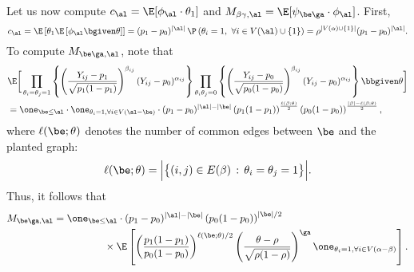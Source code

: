 \documentclass[11pt]{article}
\begin{document}
Let us now compute $c_{\al}=\E[\phi_{\al}\cdot \theta_1]$ and $M_{\beta\gamma, \al}=\E[\psi_{\be \ga}\cdot \phi_{\al}]$. First,
\begin{equation}\label{eq:c:pds}
c_{\al}=\E\left[\theta_1\E\left[\phi_{\al}\bgiven \theta\right]\right]=(p_1-p_0)^{|\al|}\,\P\left(\theta_i=1,~\forall i\in V(\al)\cup \{1\}\right)=\rho^{|V(\alpha) \cup \{1\}|}(p_1-p_0)^{|\al|}.
\end{equation}
To compute $M_{\be\ga,\al}$, note that
\begin{equation*}
\begin{split}
    &\E\bigg[\prod_{\theta_i=\theta_j=1}\left\{\left(\frac{Y_{ij}-p_1}{\sqrt{p_1(1-p_1)}}\right)^{\beta_{ij}}(Y_{ij}-p_0)^{\alpha_{ij}}\right\}\prod_{\theta_i \theta_j=0}\left\{\left(\frac{Y_{ij}-p_0}{\sqrt{p_0(1-p_0)}}\right)^{\beta_{ij}}(Y_{ij}-p_0)^{\alpha_{ij}}\right\}\bbgiven \theta\bigg]\\
    &=\one_{\be \le \al}\cdot \one_{\theta_i=1,\forall i \in V(\al-\be)}\cdot (p_1-p_0)^{|\al|-|\be|}\left(p_1(1-p_1)\right)^{\frac{\ell(\beta;\theta)}{2}}\left(p_0(1-p_0)\right)^{\frac{|\beta|-\ell(\beta;\theta)}{2}},
\end{split}
\end{equation*}
where $\ell(\be;\theta)$ denotes the number of common edges between $\be$ and the planted graph:
\begin{equation*}
    \ell(\be;\theta)=\Big|\big\{(i,j)\in E(\beta) \,:\, \theta_i=\theta_j=1\big\}\Big|.
\end{equation*}
Thus, it follows that
\begin{equation}\label{eq:M:pds}
\begin{split}
    M_{\be\ga,\al}
    &=\one_{\be\le\al}\cdot (p_1-p_0)^{|\al|-|\be|}\left(p_0(1-p_0)\right)^{|\be|/2}\\
    &\quad\quad\quad\quad\quad \times \E\left[\left(\frac{p_1(1-p_1)}{p_0(1-p_0)}\right)^{\ell(\be;\theta)/2}\left(\frac{\theta-\rho}{\sqrt{\rho(1-\rho)}}\right)^{\ga}\one_{\theta_i=1,\forall i \in V(\alpha-\beta)}\right].
    \end{split}
\end{equation}
\end{document}

